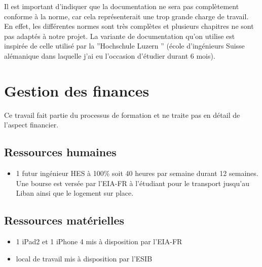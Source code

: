 Il est important d'indiquer que la documentation ne sera pas complètement conforme à la norme, car cela représenterait une trop grande charge de travail. En effet, les différentes normes sont très complètes et plusieurs chapitres ne sont pas adaptés à notre projet. La variante de documentation qu'on utilise est inspirée de celle utilisé par la ''Hochschule Luzern '' (école d'ingénieurs Suisse alémanique dans laquelle j'ai eu l'occasion d'étudier durant 6 mois).

\section{Gestion des finances}
Ce travail fait partie du processus de formation et ne traite pas en détail de l'aspect financier.
\subsection{Ressources humaines}
\begin{itemize}
	\item 1 futur ingénieur HES  à 100\%  soit 40 heures par semaine durant 12 semaines. Une bourse est versée par  l'\gls{EIA-FR} à l'étudiant pour le transport jusqu'au Liban ainsi que le logement sur place. 
\end{itemize}
\subsection{Ressources matérielles}
\begin{itemize}
	\item 1 iPad2 et 1 iPhone 4  mis à disposition par l'\gls{EIA-FR}
	\item local de travail mis à disposition par l'\gls{ESIB}
\end{itemize}